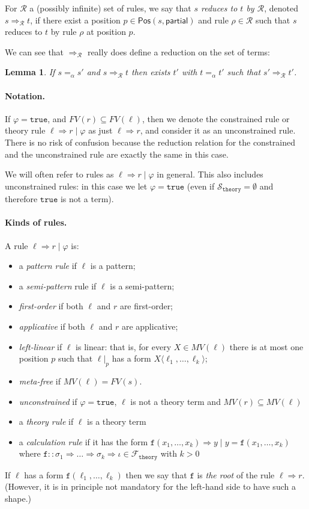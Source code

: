 \documentclass{lmcs}
\theoremstyle{theorem}\newtheorem{theorem}{Theorem}
\theoremstyle{theorem}\newtheorem{lemma}[theorem]{Lemma}
\theoremstyle{theorem}\newtheorem{corollary}[theorem]{Corollary}
\theoremstyle{definition}\newtheorem{definition}[theorem]{Definition}
\theoremstyle{definition}\newtheorem{example}[theorem]{Example}
\newcommand{\thF}{\mathcal{F}_{\mathtt{theory}}}
\newcommand{\thSorts}{\mathcal{S}_{\mathtt{theory}}}
\newcommand{\Rules}{\mathcal{R}}
\newcommand{\FV}{\mathit{FV}}
\newcommand{\FMV}{\mathit{MV}}
\newcommand{\Positions}{\mathsf{Pos}}
\newcommand{\asort}{\iota}
\newcommand{\atype}{\sigma}
\newcommand{\identifier}[1]{\mathtt{#1}}
\newcommand{\afun}{\identifier{f}}
\newcommand{\avar}{x}
\newcommand{\bvar}{y}
\newcommand{\Avar}{X}
\newcommand{\meta}[2]{#1\langle#2\rangle}
\newcommand{\arrtype}{\Rightarrow}
\newcommand{\arrz}{\Rightarrow}
\newcommand{\arr}[1]{\arrz_{#1}}
\newcommand{\symb}[1]{\mathtt{#1}}
\newcommand{\strue}{\symb{true}}
\newcommand{\myparagraph}[1]{\paragraph{\textbf{#1.}}}
\begin{document}
For $\Rules$ a (possibly infinite) set of rules, we say that \emph{$s$ reduces
to $t$ by $\Rules$}, denoted $s \arr{\Rules} t$, if there
exist a position $p \in \Positions(s,\mathsf{partial})$ and rule $\rho \in
\Rules$ such that $s$ reduces to $t$ by rule $\rho$ at position $p$.

We can see that $\arr{\Rules}$ really does define a reduction on the set of terms:

\begin{lemma}
If $s =_\alpha s'$ and $s \arr{\Rules} t$ then exists $t'$ with $t =_\alpha t'$
such that $s' \arr{\Rules} t'$.
\end{lemma}

\myparagraph{Notation} If $\varphi = \strue$, and $\FV(r) \subseteq \FV(\ell)$,
then we denote the constrained rule or theory rule $\ell \arrz r \mid \varphi$
as just $\ell \arrz r$, and consider it as an unconstrained rule.
There is no risk of confusion because the reduction relation for the constrained
and the unconstrained rule are exactly the same in this case.

We will often refer to rules as $\ell \arrz r \mid \varphi$ in general.  This
also includes unconstrained rules: in this case  we let $\varphi = \strue$
(even if $\thSorts = \emptyset$ and therefore $\strue$ is not a term).

\myparagraph{Kinds of rules}

A rule $\ell \arrz r \mid \varphi$ is:
\begin{itemize}
\item a \emph{pattern rule} if $\ell$ is a pattern;
\item a \emph{semi-pattern} rule if $\ell$ is a semi-pattern;
\item \emph{first-order} if both $\ell$ and $r$ are first-order;
\item \emph{applicative} if both $\ell$ and $r$ are applicative;
\item \emph{left-linear} if $\ell$ is linear: that is, for every $\Avar \in
  \FMV(\ell)$ there is at most one position $p$ such that $\ell|_p$ has a form
  $\meta{\Avar}{\ell_1,\dots,\ell_k}$;
\item \emph{meta-free} if $\FMV(\ell) = \FV(s)$.
\item \emph{unconstrained} if $\varphi = \strue$, $\ell$ is not a theory term
  and $\FMV(r) \subseteq \FMV(\ell)$
\item a \emph{theory rule} if $\ell$ is a theory term
\item a \emph{calculation rule} if it has the form
  $\afun(\avar_1,\dots,\avar_k) \arrz \bvar \mid \bvar = \afun(\avar_1,\dots,
  \avar_k)$ where $\afun :: \atype_1 \arrtype \dots \arrtype \atype_k \arrtype
  \asort \in \thF$ with $k > 0$
\end{itemize}
If $\ell$ has a form $\afun(\ell_1,\dots,\ell_k)$ then we say that $\afun$ is
\emph{the root} of the rule $\ell \arrz r$.  (However, it is in principle not
mandatory for the left-hand side to have such a shape.)
\end{document}
